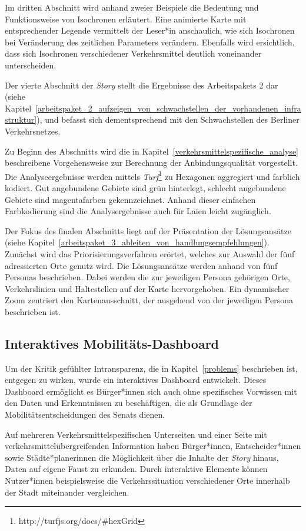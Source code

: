 Im dritten Abschnitt wird anhand zweier Beispiele die Bedeutung und Funktionsweise von Isochronen erläutert. Eine animierte Karte mit entsprechender Legende vermittelt der Leser*in anschaulich, wie sich Isochronen bei Veränderung des zeitlichen Parameters verändern. Ebenfalls wird ersichtlich, dass sich Isochronen verschiedener Verkehrsmittel deutlich voneinander unterscheiden.

Der vierte Abschnitt der \emph{Story} stellt die Ergebnisse des Arbeitspakets 2 dar (siehe Kapitel~\ref{arbeitspaket_2_aufzeigen_von_schwachstellen_der_vorhandenen_infrastruktur}), und befasst sich dementsprechend  mit den Schwachstellen des Berliner Verkehrsnetzes.

Zu Beginn des Abschnitts wird die in Kapitel~\ref{verkehrsmittelspezifische_analyse} beschreibene Vorgehensweise zur Berechnung der Anbindungsqualität vorgestellt. Die Analyseergebnisse werden mittels \emph{Turf}\footnote{http://turfjs.org/docs/\#hexGrid} zu Hexagonen aggregiert und farblich kodiert. Gut angebundene Gebiete sind  grün hinterlegt, schlecht angebundene Gebiete sind magentafarben gekennzeichnet. Anhand dieser einfachen Farbkodierung sind die Analysergebnisse auch für Laien leicht zugänglich.

Der Fokus des finalen Abschnitts liegt auf der Präsentation der Lösungsansätze (siehe Kapitel~\ref{arbeitspaket_3_ableiten_von_handlungsempfehlungen}). Zunächst wird das Priorisierungsverfahren erörtet, welches zur Auswahl der fünf adressierten Orte genutz wird. Die Lösungsansätze werden anhand von fünf Personas beschrieben. Dabei werden die zur jeweiligen Persona gehörigen Orte, Verkehrslinien und Haltestellen auf der Karte hervorgehoben. Ein dynamischer Zoom zentriert den Kartenausschnitt, der ausgehend von der jeweiligen Persona beschrieben ist.

\subsection{Interaktives Mobilitäts-Dashboard}
\label{interaktives_mobilitaets_dashboard}

Um der Kritik gefühlter Intransparenz, die in Kapitel~\ref{problems} beschrieben ist, entgegen zu wirken, wurde ein interaktives Dashboard entwickelt. Dieses Dashboard ermöglicht es Bürger*innen sich auch ohne spezifisches Vorwissen mit den Daten und Erkenntnissen zu beschäftigen, die als Grundlage der Mobilitätsentscheidungen des Senats dienen.

Auf mehreren Verkehrsmittelspezifischen Unterseiten und einer Seite mit verkehrsmittelübergreifenden Information haben Bürger*innen, Entscheider*innen sowie Städte*planerinnen die Möglichkeit über die Inhalte der \emph{Story} hinaus, Daten auf eigene Faust zu erkunden. Durch interaktive Elemente können Nutzer*innen beispielsweise die Verkehrssituation verschiedener Orte innerhalb der Stadt miteinander vergleichen.

